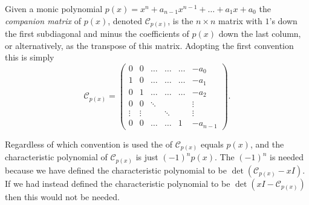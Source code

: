 \documentclass[12pt]{article}
\begin{document}
Given a monic polynomial $p(x)=x^n+a_{n-1}x^{n-1}+\dots+a_1x+a_0$ the \emph{companion matrix} of $p(x)$, denoted $\mathcal{C}_{p(x)}$, is the $n \times n$ matrix with $1$'s down the first subdiagonal and minus the coefficients of $p(x)$ down the last column, or alternatively, as the transpose of this matrix. Adopting the first convention this is simply
\begin{equation*}
\mathcal{C}_{p(x)} = \begin{pmatrix}
0 & 0 & \hdots & \hdots & \hdots & -a_0 \\
1 & 0 & \hdots & \hdots & \hdots & -a_1\\
0 & 1 & \hdots & \hdots & \hdots & -a_2 \\
0 & 0 & \ddots &   &   & \vdots \\
\vdots & \vdots &  & \ddots & &  \vdots \\
0 & 0 & \hdots & \hdots & 1 & -a_{n-1}
\end{pmatrix}.
\end{equation*}

Regardless of which convention is used the  of $\mathcal{C}_{p(x)}$ equals $p(x)$, and the characteristic polynomial of $\mathcal{C}_{p(x)}$ is just $(-1)^n p(x)$. The 
$(-1)^n$ is needed because we have defined the characteristic polynomial to be $\det(\mathcal{C}_{p(x)}- xI)$. If we had instead defined the characteristic polynomial to be $\det(xI - \mathcal{C}_{p(x)})$ then this would not be needed.
\end{document}

